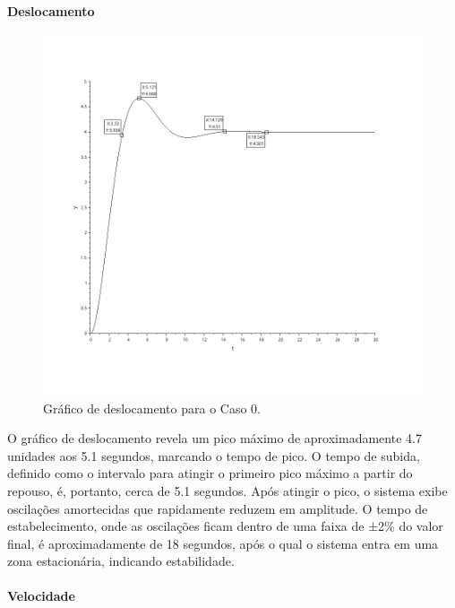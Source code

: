 \paragraph{Deslocamento}
\begin{figure}[H]
    \centering
    \includegraphics[height=0.7\textwidth]{final/2-atividade/assets/deslocamento-caso-0.png}
    \caption{Gráfico de deslocamento para o Caso 0.}
\end{figure}
O gráfico de deslocamento revela um pico máximo de aproximadamente 4.7 unidades aos 5.1 segundos, marcando o tempo de pico. O tempo de subida, definido como o intervalo para atingir o primeiro pico máximo a partir do repouso, é, portanto, cerca de 5.1 segundos. Após atingir o pico, o sistema exibe oscilações amortecidas que rapidamente reduzem em amplitude. O tempo de estabelecimento, onde as oscilações ficam dentro de uma faixa de ±2\% do valor final, é aproximadamente de 18 segundos, após o qual o sistema entra em uma zona estacionária, indicando estabilidade.

\paragraph{Velocidade}

